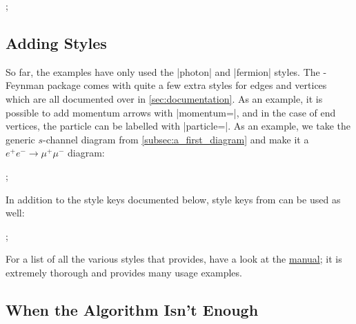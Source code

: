 \documentclass[a4paper,final]{ltxdoc}
\providecommand{\tikzfeynmanname}{\tikzname-Feynman}
\providecommand{\pgfmanual}{\href{http://mirrors.ctan.org/graphics/pgf/base/doc/pgfmanual.pdf}{\tikzname{} manual}}
\begin{document}
\begin{center}
\begin{codeexample}[]
;
\end{codeexample}
\end{center}

\subsection{Adding Styles}
\label{subsec:adding_styles}

So far, the examples have only used the |photon| and |fermion| styles.  The
\tikzfeynmanname{} package comes with quite a few extra styles for edges and
vertices which are all documented over in \cref{sec:documentation}.  As an
example, it is possible to add momentum arrows with |momentum=|, and
in the case of end vertices, the particle can be labelled with
|particle=|.  As an example, we take the generic \(s\)-channel
diagram from \cref{subsec:a_first_diagram} and make it a \(e^{+}e^{-} \to
\mu^{+}\mu^{-}\) diagram:
\begin{center}
\begin{codeexample}[]
;
\end{codeexample}
\end{center}
In addition to the style keys documented below, style keys from \tikzname{} can
be used as well:
\begin{center}
\begin{codeexample}[]
;
\end{codeexample}
\end{center}
For a list of all the various styles that \tikzname{} provides, have a look at
the \pgfmanual; it is extremely thorough and provides many usage examples.

\subsection{When the Algorithm Isn't Enough}
\label{subsec:when_the_algorithm_isnt_enough}
\end{document}
